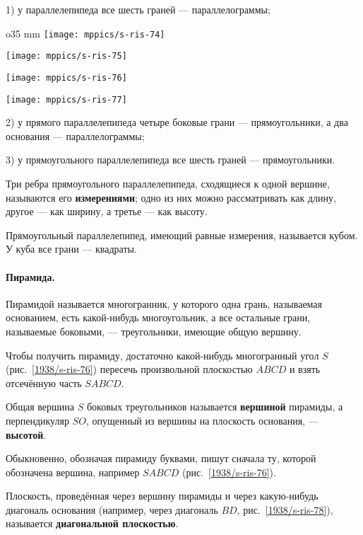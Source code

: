 1) у параллелепипеда все шесть граней — параллелограммы;

\begin{wrapfigure}[43]{o}{35 mm}
\vskip-0mm
\centering
\texttt{[image: mppics/s-ris-74]}
\caption{}\label{1938/s-ris-74}
\bigskip
\texttt{[image: mppics/s-ris-75]}
\caption{}\label{1938/s-ris-75}
\bigskip
\texttt{[image: mppics/s-ris-76]}
\caption{}\label{1938/s-ris-76}
\bigskip
\texttt{[image: mppics/s-ris-77]}
\caption{}\label{1938/s-ris-77}
\end{wrapfigure}

2) у прямого параллелепипеда четыре боковые грани — прямоугольники, а два основания — параллелограммы;

3) у прямоугольного параллелепипеда все шесть граней — прямоугольники.

Три ребра прямоугольного параллелепипеда, сходящиеся к одной вершине, называются его \textbf{измерениями};
одно из них можно рассматривать как длину, другое — как ширину, а третье — как высоту.

Прямоугольный параллелепипед, имеющий равные измерения, называется кубом.
У куба все грани — квадраты.

\paragraph{Пирамида.}\label{1938/s70}
Пирамидой называется многогранник, у которого одна грань, называемая основанием, есть какой-нибудь многоугольник, а все остальные грани, называемые боковыми, — треугольники, имеющие общую вершину.

Чтобы получить пирамиду, достаточно какой-нибудь многогранный угол $S$ (рис.~\ref{1938/s-ris-76}) пересечь произвольной плоскостью $ABCD$ и взять отсечённую часть $SABCD$.

Общая вершина $S$ боковых треугольников называется \textbf{вершиной} пирамиды, а перпендикуляр $SO$, опущенный из вершины на плоскость основания, — \textbf{высотой}.

Обыкновенно, обозначая пирамиду буквами, пишут сначала ту, которой обозначена вершина, например $SABCD$ (рис.~\ref{1938/s-ris-76}).

Плоскость, проведённая через вершину пирамиды и через какую-нибудь диагональ основания (например, через диагональ $BD$, рис.~\ref{1938/s-ris-78}), называется \textbf{диагональной плоскостью}.

